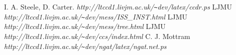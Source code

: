 \documentclass[10pt,a4paper]{article}
\begin{document}
\begin{thebibliography}{99}
I. A. Steele, D. Carter. {\em http://ltccd1.livjm.ac.uk/\verb'~'dev/latex/ccdr.ps}
LJMU {\em http://ltccd1.livjm.ac.uk/\verb'~'dev/mess/ISS\_INST.html}
LJMU {\em http://ltccd1.livjm.ac.uk/\verb'~'dev/mess/tree.html}
LJMU {\em http://ltccd1.livjm.ac.uk/\verb'~'dev/ccs/index.html}
C. J. Mottram {\em http://ltccd1.livjm.ac.uk/\verb'~'dev/ngat/latex/ngat.net.ps}
\end{thebibliography}
\end{document}
